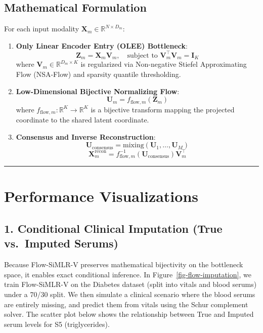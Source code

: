 \documentclass[
  letterpaper,
]{report}
\begin{document}
\subsection{Mathematical Formulation}\label{mathematical-formulation}

For each input modality \(\mathbf{X}_m \in \mathbb{R}^{N \times D_m}\):

\begin{enumerate}
\def\labelenumi{\arabic{enumi}.}
\item
  \textbf{Only Linear Encoder Entry (OLEE) Bottleneck}:
  \[\mathbf{Z}_m = \mathbf{X}_m \mathbf{V}_m, \quad \text{subject to } \mathbf{V}_m^\top \mathbf{V}_m = \mathbf{I}_K\]
  where \(\mathbf{V}_m \in \mathbb{R}^{D_m \times K}\) is regularized
  via Non-negative Stiefel Approximating Flow (NSA-Flow) and sparsity
  quantile thresholding.
\item
  \textbf{Low-Dimensional Bijective Normalizing Flow}:
  \[\mathbf{U}_m = f_{\text{flow}, m}(\mathbf{Z}_m)\] where
  \(f_{\text{flow}, m}: \mathbb{R}^K \to \mathbb{R}^K\) is a bijective
  transform mapping the projected coordinate to the shared latent
  coordinate.
\item
  \textbf{Consensus and Inverse Reconstruction}:
  \[\mathbf{U}_{\text{consensus}} = \text{mixing}(\mathbf{U}_1, \dots, \mathbf{U}_M)\]
  \[\mathbf{X}_m^{\text{recon}} = f_{\text{flow}, m}^{-1}(\mathbf{U}_{\text{consensus}}) \mathbf{V}_m^\top\]
\end{enumerate}

\begin{center}\rule{0.5\linewidth}{0.5pt}\end{center}

\section{Performance Visualizations}\label{performance-visualizations}

\subsection{1. Conditional Clinical Imputation (True vs.~Imputed
Serums)}\label{conditional-clinical-imputation-true-vs.-imputed-serums}

Because Flow-SiMLR-V preserves mathematical bijectivity on the
bottleneck space, it enables exact conditional inference. In
Figure~\ref{fig-flow-imputation}, we train Flow-SiMLR-V on the Diabetes
dataset (split into vitals and blood serums) under a 70/30 split. We
then simulate a clinical scenario where the blood serums are entirely
missing, and predict them from vitals using the Schur complement solver.
The scatter plot below shows the relationship between True and Imputed
serum levels for S5 (triglycerides).
\end{document}
